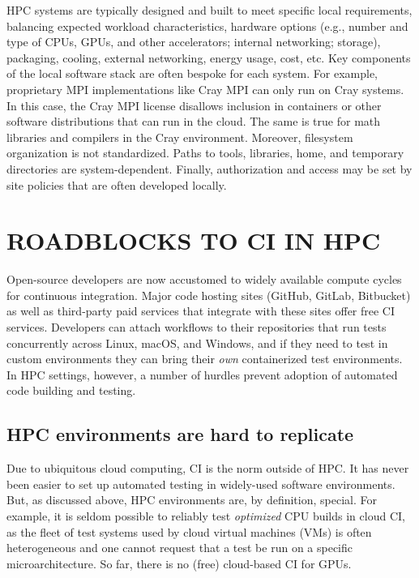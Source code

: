 \documentclass{IEEEcsmag}
\begin{document}
HPC systems are typically designed and built to meet specific local requirements, balancing
expected workload characteristics, hardware options (e.g., number and type of CPUs, GPUs,
and other accelerators; internal networking; storage), packaging, cooling, external networking,
energy usage, cost, etc.
Key components of the local software stack are often bespoke for each system.
For example, proprietary MPI implementations like Cray MPI can only run
on Cray systems. In this case, the Cray MPI license disallows inclusion in
containers or other software distributions that can run in the cloud. The same is true
for math libraries and compilers in the Cray environment. Moreover, 
filesystem organization is not standardized.  Paths to tools, libraries, home, and
temporary directories are system-dependent.
Finally, authorization and access may be set by site policies that are often developed locally.



\section{ROADBLOCKS TO CI IN HPC}

Open-source developers are now accustomed to widely available compute cycles for
continuous integration. Major code hosting sites
(GitHub, GitLab, Bitbucket) as well as third-party paid services that integrate with
these sites offer free CI services. Developers can attach workflows to their repositories that run tests
concurrently across Linux, macOS, and Windows, and if they need to test in
custom environments they can bring their {\it own} containerized test environments.
In HPC settings, however, a number of hurdles prevent adoption of automated code building and testing.

\subsection{HPC environments are hard to replicate}

Due to ubiquitous cloud computing, CI is the norm outside of HPC. It has never been
easier to set up automated testing in widely-used software environments.
But, as discussed above, HPC environments are, by definition, special.
For example, it is seldom possible to reliably test {\it optimized} CPU builds in
cloud CI, as the fleet of test systems used by cloud virtual machines (VMs) is often heterogeneous and one
cannot request that a test be run on a specific microarchitecture. So far, there is no (free) cloud-based
CI for GPUs.
\end{document}
